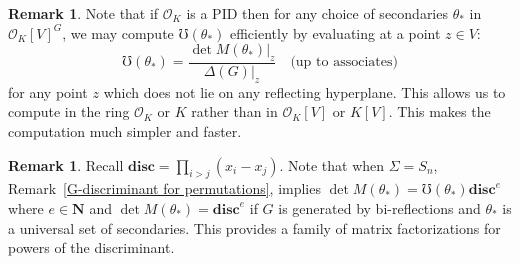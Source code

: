 \documentclass[12pt]{amsart}
\newcommand{\NN}{\mathbf{N}} %
\newcommand{\NN}{\mathbb{N}} %
\newcommand{\Sn}{{S_n}}
\newcommand{\OK}{{{\mathcal O}_K}}
\theoremstyle{definition}
\newtheorem{remark}[thm]{Remark}
\newcommand{\disc}{{\mathbf{disc}}}
\newcommand{\bth}{{{\theta_*}}} %
\begin{document}
    \begin{remark}\label{evaluation}
  Note that if $\OK$ is a PID then for any choice of secondaries $\bth$ in $\OK[V]^G$, we may compute $\mho(\bth)$ efficiently by evaluating at a point $z \in V$:
  $$\mho(\bth) = \frac{\det M(\bth)\rvert_z}{\Delta(G)\rvert_z}\quad\text{(up to associates)}$$
for any point $z$ which does not lie on any reflecting hyperplane.  This allows us to compute
in the ring $\OK$ or $K$ rather than in $\OK[V]$ or $K[V]$.  
This makes the computation much simpler and faster.
\end{remark}

\begin{remark}
Recall $\disc=\prod_{i>j} (x_i-x_j)$.   
Note that when $\Sigma=\Sn$, 
Remark~\ref{G-discriminant for permutations}, implies
$\det M(\bth) = \mho(\bth) \disc^e$ where $e \in \NN$ and 
$\det M(\bth) = \disc^e$ if $G$ is generated by 
bi-reflections and $\bth$ is a universal set of 
secondaries.  
This provides a family of matrix 
factorizations for powers of the discriminant.
\end{remark}
\end{document}
